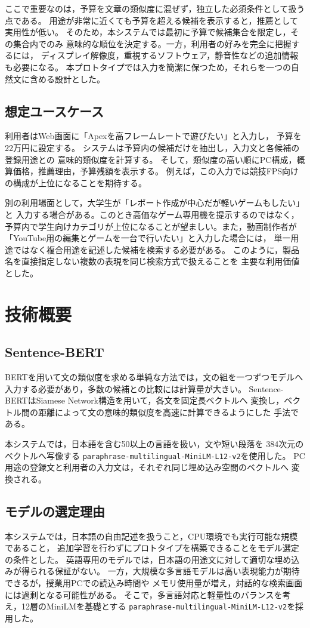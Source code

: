 \documentclass[a4paper,11pt]{article}
\begin{document}
ここで重要なのは，予算を文章の類似度に混ぜず，独立した必須条件として扱う点である。
用途が非常に近くても予算を超える候補を表示すると，推薦として実用性が低い。
そのため，本システムでは最初に予算で候補集合を限定し，その集合内でのみ
意味的な順位を決定する。一方，利用者の好みを完全に把握するには，
ディスプレイ解像度，重視するソフトウェア，静音性などの追加情報も必要になる。
本プロトタイプでは入力を簡潔に保つため，それらを一つの自然文に含める設計とした。

\subsection{想定ユースケース}
利用者はWeb画面に「Apexを高フレームレートで遊びたい」と入力し，
予算を22万円に設定する。
システムは予算内の候補だけを抽出し，入力文と各候補の登録用途との
意味的類似度を計算する。
そして，類似度の高い順にPC構成，概算価格，推薦理由，予算残額を表示する。
例えば，この入力では競技FPS向けの構成が上位になることを期待する。

別の利用場面として，大学生が「レポート作成が中心だが軽いゲームもしたい」と
入力する場合がある。このとき高価なゲーム専用機を提示するのではなく，
予算内で学生向けカテゴリが上位になることが望ましい。また，動画制作者が
「YouTube用の編集とゲームを一台で行いたい」と入力した場合には，
単一用途ではなく複合用途を記述した候補を検索する必要がある。
このように，製品名を直接指定しない複数の表現を同じ検索方式で扱えることを
主要な利用価値とした。


\section{技術概要}

\subsection{Sentence-BERT}
BERTを用いて文の類似度を求める単純な方法では，文の組を一つずつモデルへ
入力する必要があり，多数の候補との比較には計算量が大きい。
Sentence-BERTはSiamese Network構造を用いて，各文を固定長ベクトルへ
変換し，ベクトル間の距離によって文の意味的類似度を高速に計算できるようにした
手法である\cite{SBERT}。

本システムでは，日本語を含む50以上の言語を扱い，文や短い段落を
384次元のベクトルへ写像する
\verb|paraphrase-multilingual-MiniLM-L12-v2|を使用した\cite{ModelCard}。
PC用途の登録文と利用者の入力文は，それぞれ同じ埋め込み空間のベクトルへ
変換される。

\subsection{モデルの選定理由}
本システムでは，日本語の自由記述を扱うこと，CPU環境でも実行可能な規模であること，
追加学習を行わずにプロトタイプを構築できることをモデル選定の条件とした。
英語専用のモデルでは，日本語の用途文に対して適切な埋め込みが得られる保証がない。
一方，大規模な多言語モデルは高い表現能力が期待できるが，授業用PCでの読込み時間や
メモリ使用量が増え，対話的な検索画面には過剰となる可能性がある。
そこで，多言語対応と軽量性のバランスを考え，12層のMiniLMを基礎とする
\verb|paraphrase-multilingual-MiniLM-L12-v2|を採用した。
\end{document}
